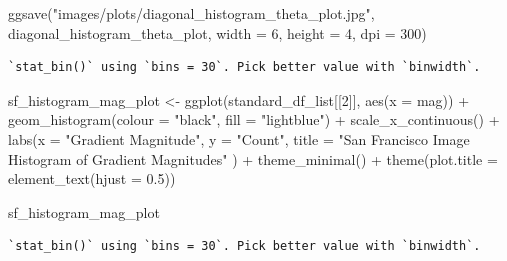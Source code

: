 \documentclass[
  letterpaper,
  DIV=11,
  numbers=noendperiod]{scrreprt}
\newenvironment{Shaded}{\begin{snugshade}}{\end{snugshade}}
\newcommand{\AttributeTok}[1]{\textcolor[rgb]{0.40,0.45,0.13}{#1}}
\newcommand{\DecValTok}[1]{\textcolor[rgb]{0.68,0.00,0.00}{#1}}
\newcommand{\FloatTok}[1]{\textcolor[rgb]{0.68,0.00,0.00}{#1}}
\newcommand{\FunctionTok}[1]{\textcolor[rgb]{0.28,0.35,0.67}{#1}}
\newcommand{\NormalTok}[1]{\textcolor[rgb]{0.00,0.23,0.31}{#1}}
\newcommand{\OtherTok}[1]{\textcolor[rgb]{0.00,0.23,0.31}{#1}}
\newcommand{\SpecialCharTok}[1]{\textcolor[rgb]{0.37,0.37,0.37}{#1}}
\newcommand{\StringTok}[1]{\textcolor[rgb]{0.13,0.47,0.30}{#1}}
\begin{document}
\begin{Shaded}
\begin{Highlighting}[]
\FunctionTok{ggsave}\NormalTok{(}\StringTok{"images/plots/diagonal\_histogram\_theta\_plot.jpg"}\NormalTok{, diagonal\_histogram\_theta\_plot, }\AttributeTok{width =} \DecValTok{6}\NormalTok{, }\AttributeTok{height =} \DecValTok{4}\NormalTok{, }\AttributeTok{dpi =} \DecValTok{300}\NormalTok{)}
\end{Highlighting}
\end{Shaded}

\begin{verbatim}
`stat_bin()` using `bins = 30`. Pick better value with `binwidth`.
\end{verbatim}

\begin{Shaded}
\begin{Highlighting}[]
\NormalTok{sf\_histogram\_mag\_plot }\OtherTok{\textless{}{-}}
  \FunctionTok{ggplot}\NormalTok{(standard\_df\_list[[}\DecValTok{2}\NormalTok{]], }\FunctionTok{aes}\NormalTok{(}\AttributeTok{x =}\NormalTok{ mag)) }\SpecialCharTok{+}
  \FunctionTok{geom\_histogram}\NormalTok{(}\AttributeTok{colour =} \StringTok{"black"}\NormalTok{, }\AttributeTok{fill =} \StringTok{"lightblue"}\NormalTok{) }\SpecialCharTok{+}
  \FunctionTok{scale\_x\_continuous}\NormalTok{() }\SpecialCharTok{+} 
  \FunctionTok{labs}\NormalTok{(}\AttributeTok{x =} \StringTok{"Gradient Magnitude"}\NormalTok{, }
       \AttributeTok{y =} \StringTok{"Count"}\NormalTok{, }
       \AttributeTok{title =} \StringTok{"San Francisco Image Histogram of Gradient Magnitudes"}
\NormalTok{       ) }\SpecialCharTok{+}
  \FunctionTok{theme\_minimal}\NormalTok{() }\SpecialCharTok{+}
  \FunctionTok{theme}\NormalTok{(}\AttributeTok{plot.title =} \FunctionTok{element\_text}\NormalTok{(}\AttributeTok{hjust =} \FloatTok{0.5}\NormalTok{))}

\NormalTok{sf\_histogram\_mag\_plot}
\end{Highlighting}
\end{Shaded}

\begin{verbatim}
`stat_bin()` using `bins = 30`. Pick better value with `binwidth`.
\end{verbatim}
\end{document}
